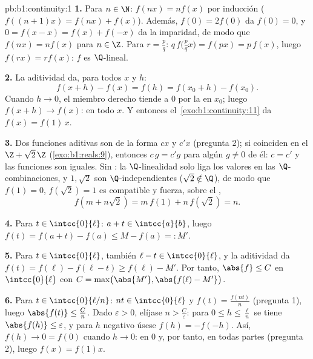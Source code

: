 \begin{solution}{pb:b1:continuity:1}
\textbf{1.} Para $n \in \N$: $f(nx) = n f(x)$ por inducción
($f((n+1)x) = f(nx) + f(x)$). Además, $f(0) = 2f(0)$ da $f(0) = 0$,
y $0 = f(x - x) = f(x) + f(-x)$ da la imparidad, de modo que
$f(nx) = nf(x)$ para $n \in \Z$. Para $r = \frac pq$:
$q\,f\bigl(\tfrac pq x\bigr) = f(px) = p\,f(x)$, luego
$f(rx) = r f(x)$: $f$ es $\Q$-lineal.

\textbf{2.} La aditividad da, para todos $x$ y $h$:
\[
f(x + h) - f(x) = f(h) = f(x_0 + h) - f(x_0) .
\]
Cuando $h \to 0$, el miembro derecho tiende a $0$ por la
 en $x_0$; luego $f(x + h) \to f(x)$:  en todo
$x$. Y entonces el~\cref{exo:b1:continuity:11} da $f(x) = f(1)\,x$.

\textbf{3.} Dos funciones aditivas  son de la forma $cx$ y
$c'x$ (pregunta 2); si coinciden en el  
$\Z + \sqrt2\,\Z$ (\cref{exo:b1:reals:9}), entonces $c\,g = c'g$ para
algún $g \neq 0$ de él: $c = c'$ y las funciones son iguales. Sin
: la $\Q$-linealidad solo liga los valores en las
$\Q$-combinaciones, y $1, \sqrt2$ son $\Q$-independientes
($\sqrt2 \notin \Q$), de modo que $f(1) = 0$, $f(\sqrt2) = 1$ es
compatible y fuerza, sobre el ,
\[
f(m + n\sqrt2) = m\,f(1) + n\,f(\sqrt2) = n .
\]

\textbf{4.} Para $t \in \intcc{0}{\ell}$: $a + t \in \intcc{a}{b}$,
luego $f(t) = f(a + t) - f(a) \leq M - f(a) =: M'$.

\textbf{5.} Para $t \in \intcc{0}{\ell}$, también
$\ell - t \in \intcc{0}{\ell}$, y la aditividad da
$f(t) = f(\ell) - f(\ell - t) \geq f(\ell) - M'$. Por tanto,
$\abs{f} \leq C$ en $\intcc{0}{\ell}$ con
$C = \max\bigl(\abs{M'}, \abs{f(\ell) - M'}\bigr)$.

\textbf{6.} Para $t \in \intcc{0}{\ell/n}$: $nt \in \intcc{0}{\ell}$
y $f(t) = \frac{f(nt)}{n}$ (pregunta 1), luego
$\abs{f(t)} \leq \frac Cn$. Dado $\varepsilon > 0$, elíjase
$n > \frac C\varepsilon$: para $0 \leq h \leq \frac\ell n$ se tiene
$\abs{f(h)} \leq \varepsilon$, y para $h$ negativo úsese
$f(h) = -f(-h)$. Así, $f(h) \to 0 = f(0)$ cuando $h \to 0$:
 en $0$ y, por tanto, en todas partes (pregunta 2),
luego $f(x) = f(1)x$.


\end{solution}
